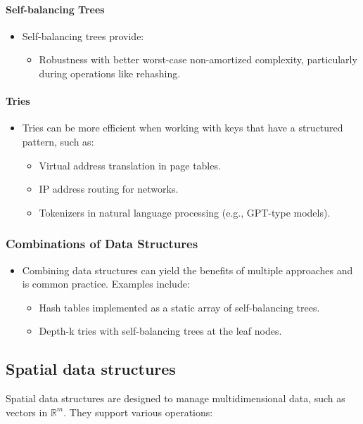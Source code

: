 \documentclass[12pt]{article}
\begin{document}
\paragraph{Self-balancing Trees}
\begin{itemize}
    \item Self-balancing trees provide:
    \begin{itemize}
        \item Robustness with better worst-case non-amortized complexity, particularly during operations like rehashing.
    \end{itemize}
\end{itemize}

\paragraph{Tries}
\begin{itemize}
    \item Tries can be more efficient when working with keys that have a structured pattern, such as:
    \begin{itemize}
        \item Virtual address translation in page tables.
        \item IP address routing for networks.
        \item Tokenizers in natural language processing (e.g., GPT-type models).
    \end{itemize}
\end{itemize}

\subsubsection{Combinations of Data Structures}
\begin{itemize}
    \item Combining data structures can yield the benefits of multiple approaches and is common practice. Examples include:
    \begin{itemize}
        \item Hash tables implemented as a static array of self-balancing trees.
        \item Depth-k tries with self-balancing trees at the leaf nodes.
    \end{itemize}
\end{itemize}



\subsection{Spatial data structures}
Spatial data structures are designed to manage multidimensional data, such as vectors in $\mathbb{R}^m$. They support various operations:
\end{document}
